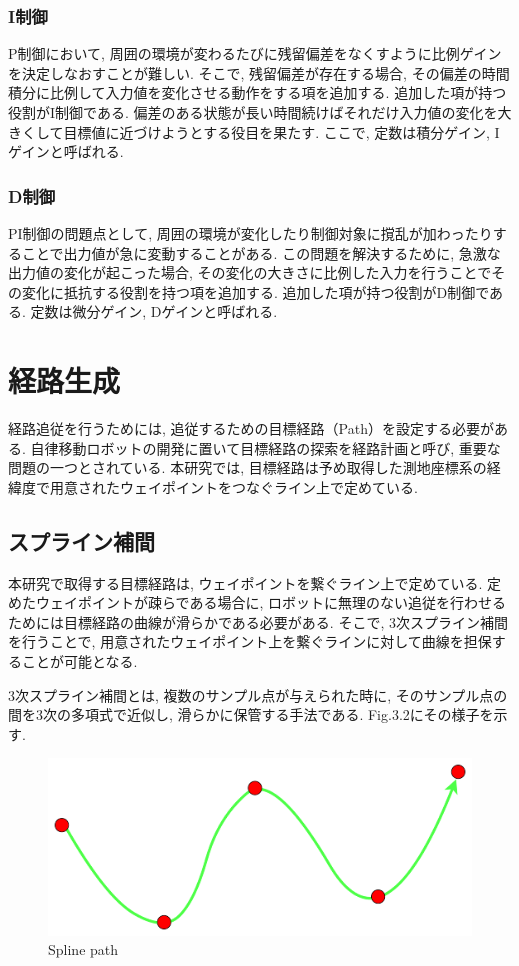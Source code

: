 \subsubsection{I制御}
P制御において, 周囲の環境が変わるたびに残留偏差をなくすように比例ゲインを決定しなおすことが難しい.
そこで, 残留偏差が存在する場合, その偏差の時間積分に比例して入力値を変化させる動作をする項を追加する.
追加した項が持つ役割がI制御である.
偏差のある状態が長い時間続けばそれだけ入力値の変化を大きくして目標値に近づけようとする役目を果たす.
ここで, 定数は積分ゲイン, Iゲインと呼ばれる.

\subsubsection{D制御}
PI制御の問題点として, 周囲の環境が変化したり制御対象に撹乱が加わったりすることで出力値が急に変動することがある.
この問題を解決するために, 急激な出力値の変化が起こった場合, その変化の大きさに比例した入力を行うことでその変化に抵抗する役割を持つ項を追加する.
追加した項が持つ役割がD制御である.
定数は微分ゲイン, Dゲインと呼ばれる.

\section{経路生成}
経路追従を行うためには, 追従するための目標経路（Path）を設定する必要がある.
自律移動ロボットの開発に置いて目標経路の探索を経路計画と呼び, 重要な問題の一つとされている.
本研究では, 目標経路は予め取得した測地座標系の経緯度で用意されたウェイポイントをつなぐライン上で定めている.


\subsection{スプライン補間}
本研究で取得する目標経路は, ウェイポイントを繋ぐライン上で定めている.
定めたウェイポイントが疎らである場合に, ロボットに無理のない追従を行わせるためには目標経路の曲線が滑らかである必要がある.
そこで, 3次スプライン補間を行うことで, 用意されたウェイポイント上を繋ぐラインに対して曲線を担保することが可能となる.

3次スプライン補間とは, 複数のサンプル点が与えられた時に, そのサンプル点の間を3次の多項式で近似し, 滑らかに保管する手法である.
Fig.3.2にその様子を示す.

\begin{figure}[H]
     \centering
    \includegraphics[keepaspectratio, scale=0.5]
         {images/splinepath.png}
    \caption{Spline path}
    \label{fig:purepursuit}
\end{figure}


\newpage